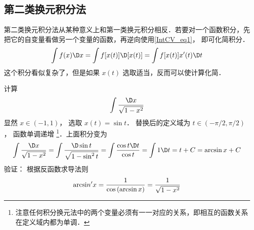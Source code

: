 \subsection{第二类换元积分法}
第二类换元积分法从某种意义上和第一类换元积分相反．若要对一个函数积分，先把它的自变量看做另一个变量的函数，再逆向使用\autoref{IntCV_eq1}， 即可化简积分．
\begin{equation}\label{IntCV_eq6}
\int f(x)\D x = \int f[x(t)]\D [x(t)] = \int f[x(t)]x'(t)\D t
\end{equation}
这个积分看似复杂了，但是如果 $x\left( t \right)$ 选取适当，反而可以使计算化简．

\begin{exam}{}
计算
\[\int \frac{\D x}{\sqrt{1-x^2}}\]
显然 $x \in \left( { - 1,1} \right)$， 选取 $x(t)=\sin t$． 替换后的定义域为 $t \in ( -\pi/2,\pi/2)$， 函数单调递增 \footnote{注意任何积分换元法中的两个变量必须有一一对应的关系，即相互的函数关系在定义域内都为单调．}．上面积分变为
\begin{equation}
\int \frac{\D x}{\sqrt{1-x^2}}  = \int \frac{\D\sin t}{\sqrt{1-\sin^2 t}} = \int \frac{\cos t\D t}{\cos t}  = \int {1\D t}  = t + C = \arcsin x + C
\end{equation}
验证： 根据反函数求导法则
\begin{equation}
{\mathop{\rm arcsi}\nolimits} n'x = \frac{1}{{\cos \left( {\arcsin x} \right)}} = \frac{1}{{\sqrt {1 - {x^2}} }}
\end{equation}
\end{exam}




